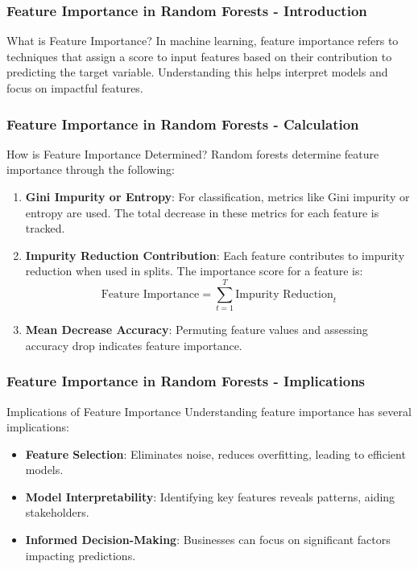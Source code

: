 \documentclass[aspectratio=169]{beamer}
\begin{document}
\begin{frame}[fragile]
    \frametitle{Feature Importance in Random Forests - Introduction}
    \begin{block}{What is Feature Importance?}
        In machine learning, feature importance refers to techniques that assign a score to input features based on their contribution to predicting the target variable. 
        Understanding this helps interpret models and focus on impactful features.
    \end{block}
\end{frame}

\begin{frame}[fragile]
    \frametitle{Feature Importance in Random Forests - Calculation}
    \begin{block}{How is Feature Importance Determined?}
        Random forests determine feature importance through the following:
    \end{block}
    \begin{enumerate}
        \item \textbf{Gini Impurity or Entropy}: 
        For classification, metrics like Gini impurity or entropy are used. The total decrease in these metrics for each feature is tracked.
        \item \textbf{Impurity Reduction Contribution}: 
        Each feature contributes to impurity reduction when used in splits. The importance score for a feature is:
        \begin{equation}
            \text{Feature Importance} = \sum_{t=1}^{T} \text{Impurity Reduction}_t
        \end{equation}
        \item \textbf{Mean Decrease Accuracy}: 
        Permuting feature values and assessing accuracy drop indicates feature importance.
    \end{enumerate}
\end{frame}

\begin{frame}[fragile]
    \frametitle{Feature Importance in Random Forests - Implications}
    \begin{block}{Implications of Feature Importance}
        Understanding feature importance has several implications:
    \end{block}
    \begin{itemize}
        \item \textbf{Feature Selection}: Eliminates noise, reduces overfitting, leading to efficient models.
        \item \textbf{Model Interpretability}: Identifying key features reveals patterns, aiding stakeholders.
        \item \textbf{Informed Decision-Making}: Businesses can focus on significant factors impacting predictions.
    \end{itemize}
\end{frame}
\end{document}
